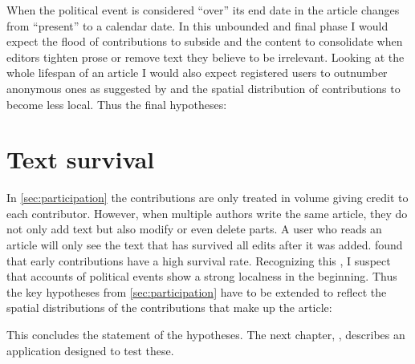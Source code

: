 When the political event is considered ``over'' its end date in the article changes from ``present'' to a calendar date.
In this unbounded and final phase I would expect the flood of contributions to subside and the content to consolidate when editors tighten prose or remove text they believe to be irrelevant.
Looking at the whole lifespan of an article I would also expect registered users to outnumber anonymous ones as suggested by \textcite{kittur2007power} and the spatial distribution of contributions to become less local.
Thus the final hypotheses:





\section{Text survival}\label{sec:textsurvival}

In \ref{sec:participation} the contributions are only treated in volume giving credit to each contributor.
However, when multiple authors write the same article, they do not only add text but also modify or even delete parts.
A user who reads an article will only see the text that has survived all edits after it was added.
\textcite{viegas2004history} found that early contributions have a high survival rate.
Recognizing this , I suspect that accounts of political events show a strong localness in the beginning.
Thus the key hypotheses from \ref{sec:participation} have to be extended to reflect the spatial distributions of the contributions that make up the article:



This concludes the statement of the hypotheses.
The next chapter, , describes an application designed to test these.
